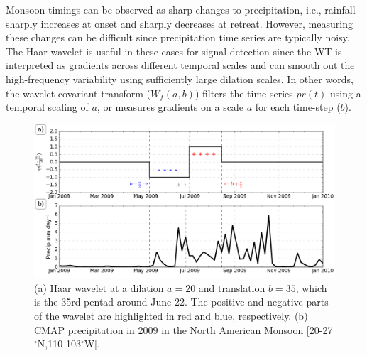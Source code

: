  Monsoon timings can be observed as sharp changes to precipitation, i.e., rainfall sharply increases at onset and sharply decreases at retreat. However, measuring these changes can be difficult since precipitation time series are typically noisy. The Haar wavelet is useful in these cases for signal detection since the WT is interpreted as  gradients across different temporal scales and can smooth out the high-frequency variability using sufficiently large dilation scales. 
  In other words, the wavelet covariant transform ($W_f(a,b)$) filters the time series $pr(t)$ using a temporal scaling of $a$, or measures gradients on a scale $a$ for each time-step ($b$).
  
  \begin{figure}[t!]
\centering
 \includegraphics[width=\linewidth]{figures/wav1.png}
\caption[Haar wavelet exmaple]{ (a) Haar wavelet at a dilation $a=20$ and translation $b=35$, which is the 35rd pentad around June 22. The positive and negative parts of the wavelet are highlighted in red and blue, respectively. (b) CMAP precipitation in 2009 in the North American Monsoon [20-27$^\circ$N,110-103$^\circ$W]. }
\label{fig:wvt_f1}
\end{figure}


